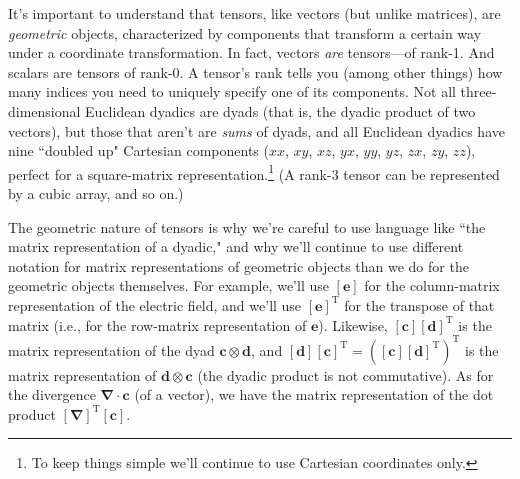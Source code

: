 \documentclass[12pt]{article}
\renewcommand{\vv}[1]{\mathbf{#1}}
\newcommand{\del}{\boldsymbol{\nabla}}
\begin{document}
It's important to understand that tensors, like vectors (but unlike matrices), are \emph{geometric} objects, characterized by components that transform a certain way under a coordinate transformation. In fact, vectors \emph{are} tensors---of rank-1. And scalars are tensors of rank-0. A tensor's rank tells you (among other things) how many indices you need to uniquely specify one of its components. Not all three-dimensional Euclidean dyadics are dyads (that is, the dyadic product of two vectors), but those that aren't are \emph{sums} of dyads, and all Euclidean dyadics have nine ``doubled up" Cartesian components ($xx$, $xy$, $xz$, $yx$, $yy$, $yz$, $zx$, $zy$, $zz$), perfect for a square-matrix representation.\footnote{To keep things simple we'll continue to use Cartesian coordinates only.} (A rank-3 tensor can be represented by a cubic array, and so on.)

The geometric nature of tensors is why we're careful to use language like ``the matrix representation of a dyadic," and why we'll continue to use different notation for matrix representations of geometric objects than we do for the geometric objects themselves. For example, we'll use $[\vv e]$ for the column-matrix representation of the electric field, and we'll use $[\vv e]^{\textrm{T}}$ for the transpose of that matrix (i.e., for the row-matrix representation of $\vv e$). Likewise, $[\vv c][\vv d]^{\textrm{T}}$ is the matrix representation of the dyad $\vv c \otimes \vv d$, and ${[\vv d][\vv c]^{\textrm{T}} = ([\vv c][\vv d]^{\textrm{T}})^{\textrm{T}}}$ is the matrix representation of $\vv d \otimes \vv c$ (the dyadic product is not commutative). As for the divergence $\del \cdot \vv c$ (of a vector), we have the matrix representation of the dot product $[\del]^{\textrm{T}}[\vv c]$.
\end{document}
